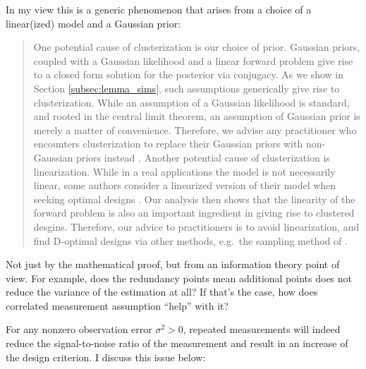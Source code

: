 \AR In my view this is a generic phenomenon that arises from a choice
of a linear(ized) model and a Gaussian prior:
\begin{quote}%
  One potential cause of clusterization is our choice of prior. Gaussian
priors, coupled with a Gaussian likelihood and a linear forward
problem give rise to a closed form solution for the posterior via
conjugacy. As we show in Section \ref{subsec:lemma_sims}, such
assumptions generically give rise to clusterization. While an
assumption of a Gaussian likelihood is standard, and rooted in the
central limit theorem, an assumption of Gaussian prior is merely a
matter of convenience. Therefore, we advise any practitioner who
encounters clusterization to replace their Gaussian priors with
non-Gaussian priors instead \cite{hosseini2017, hosseini2019}.
\newline %
Another potential cause of clusterization is linearization. While in a
real applications the model is not necessarily linear, some authors
consider a linearized version of their model when seeking optimal
designs \cite{fedorov1996, neitzel2019sparse}. Our analysis then shows
that the linearity of the forward problem is also an important
ingredient in giving rise to clustered desgins. Therefore, our advice
to practitioners is to avoid linearization, and find D-optimal designs
via other methods, e.g.~the sampling method of \cite{ryan2003}.
\end{quote}


\RC Not just by the mathematical proof, but from an information theory
point of view. For example, does the redundancy points mean additional
points does not reduce the variance of the estimation at all? If
that’s the case, how does correlated measurement assumption “help”
with it?

\AR For any nonzero observation error $\sigma^2 > 0$, repeated
measurements will indeed reduce the signal-to-noise ratio of the
measurement and result in an increase of the design criterion. I
discuss this issue below:

